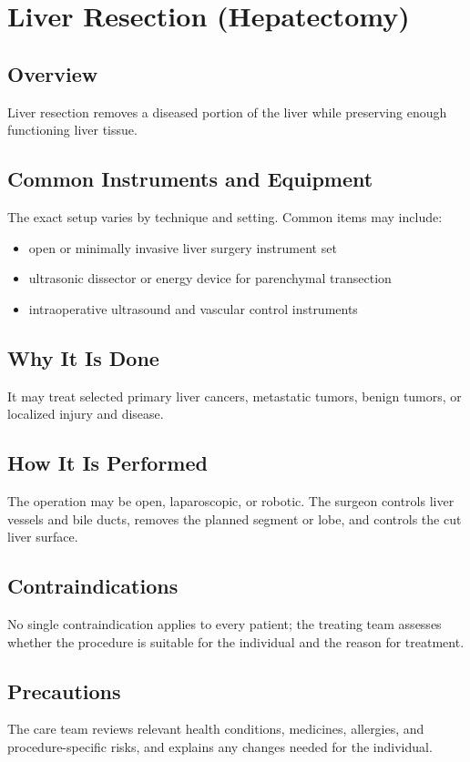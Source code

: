 \chapter{Liver Resection (Hepatectomy)}
\section*{Overview}
Liver resection removes a diseased portion of the liver while preserving enough functioning liver tissue.
\section*{Common Instruments and Equipment}
The exact setup varies by technique and setting. Common items may include:
\begin{itemize}[nosep,leftmargin=*]
  \item open or minimally invasive liver surgery instrument set
  \item ultrasonic dissector or energy device for parenchymal transection
  \item intraoperative ultrasound and vascular control instruments
\end{itemize}

\section*{Why It Is Done}
It may treat selected primary liver cancers, metastatic tumors, benign tumors, or localized injury and disease.
\section*{How It Is Performed}
The operation may be open, laparoscopic, or robotic. The surgeon controls liver vessels and bile ducts, removes the planned segment or lobe, and controls the cut liver surface.
\section*{Contraindications}
No single contraindication applies to every patient; the treating team assesses whether the procedure is suitable for the individual and the reason for treatment.

\section*{Precautions}
The care team reviews relevant health conditions, medicines, allergies, and procedure-specific risks, and explains any changes needed for the individual.

